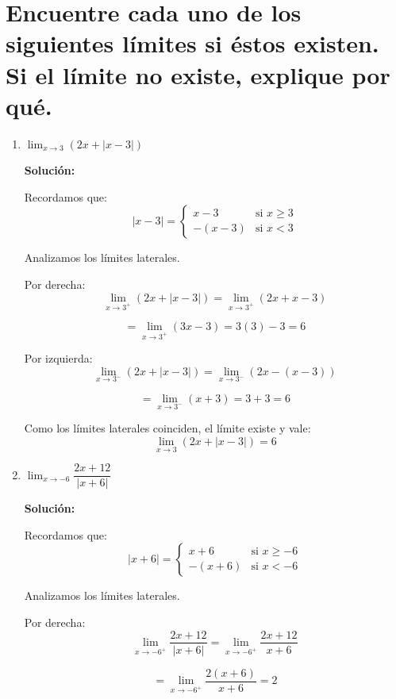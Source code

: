 \documentclass[12pt]{article}
\newcommand{\solucion}{%
    \vspace{0.8em}%
    \textbf{Solución:}%
}
\begin{document}
\section[Límites que requieren simplificación]{Encuentre cada uno de los siguientes límites si éstos existen. Si el límite no existe, explique por qué.}

\begin{enumerate}[label=\alph*)]
    \item $\lim_{x \to 3} (2x + |x - 3|)$

    \solucion

    Recordamos que:
    \[
    |x-3|=
    \begin{cases}
    x-3 & \text{si } x\ge 3 \\
    -(x-3) & \text{si } x<3
    \end{cases}
    \]

    Analizamos los límites laterales.

    Por derecha:
    \[
    \lim_{x\to3^+}(2x+|x-3|)
    =
    \lim_{x\to3^+}(2x+x-3)
    \]

    \[
    =
    \lim_{x\to3^+}(3x-3)
    =
    3(3)-3
    =
    6
    \]

    Por izquierda:
    \[
    \lim_{x\to3^-}(2x+|x-3|)
    =
    \lim_{x\to3^-}(2x-(x-3))
    \]

    \[
    =
    \lim_{x\to3^-}(x+3)
    =
    3+3
    =
    6
    \]

    Como los límites laterales coinciden, el límite existe y vale:
    \[
    \boxed{
    \lim_{x\to3}(2x+|x-3|)=6
    }
    \]

    \item $\lim_{x \to -6} \dfrac{2x + 12}{|x + 6|}$

    \solucion

    Recordamos que:
    \[
    |x+6|=
    \begin{cases}
    x+6 & \text{si } x\ge -6 \\
    -(x+6) & \text{si } x<-6
    \end{cases}
    \]

    Analizamos los límites laterales.

    Por derecha:
    \[
    \lim_{x\to-6^+}\frac{2x+12}{|x+6|}
    =
    \lim_{x\to-6^+}\frac{2x+12}{x+6}
    \]

    \[
    =
    \lim_{x\to-6^+}\frac{2(x+6)}{x+6}
    =
    2
    \]


\end{enumerate}
\end{document}
